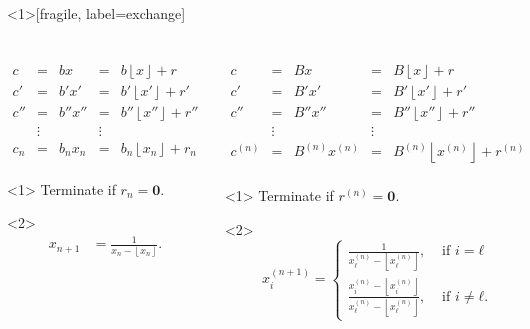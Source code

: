 \documentclass[aspectratio=169]{beamer}
\newcommand\floor[1]{\left\lfloor#1\right\rfloor}
\begin{document}
\begin{frame}<1>[fragile, label={exchange}]
  \frametitle{}
  \small
  \begin{columns}
    \begin{center}
      \[
        \begin{array}{lclcl}
          c   & = & b x     & = & b \floor{x} + r       \\
          c'  & = & b' x'   & = & b' \floor{x'} + r'    \\
          c'' & = & b'' x'' & = & b'' \floor{x''} + r'' \\
              & ⋮ &         & ⋮ &                       \\
          c_n & = & b_n x_n & = & b_n \floor{x_n} + r_n \\
        \end{array}
      \]
      \begin{onlyenv}<1>
        Terminate if $r_n = \symbf 0$.
      \end{onlyenv}
      \begin{onlyenv}<2>
        \begin{align*}
          x_{n+1} & = \frac{1}{x_n - \floor{x_n}}.
        \end{align*}
      \end{onlyenv}
    \end{center}

    \begin{center}
      \[
        \begin{array}{lclcl}
          c       & = & B x             & = & B \floor{x} + r             \\
          c'      & = & B' x'           & = & B' \floor{x'} + r'          \\
          c''     & = & B'' x''         & = & B'' \floor{x''} + r''       \\
                  & ⋮ &                 & ⋮ &                             \\
          c^{(n)} & = & B^{(n)} x^{(n)} & = & B^{(n)} \floor{x^{(n)}} + r^{(n)} \\
        \end{array}
      \]
      \begin{onlyenv}<1>
        Terminate if $r^{(n)} = \symbf 0$.
      \end{onlyenv}
      \begin{onlyenv}<2>
        \[
          x_i^{(n+1)} =
          \begin{cases}
            \frac{1}{x_ℓ^{(n)} - \floor{x_ℓ^{(n)}}}, & \text{ if } i = ℓ \\[1.2em]
            \frac{x_i^{(n)} - \floor{x_i^{(n)}}}{x_ℓ^{(n)} - \floor{x_ℓ^{(n)}}}, & \text{ if } i ≠ ℓ.
          \end{cases}
        \]
      \end{onlyenv}
    \end{center}
  \end{columns}
\end{frame}
\end{document}

